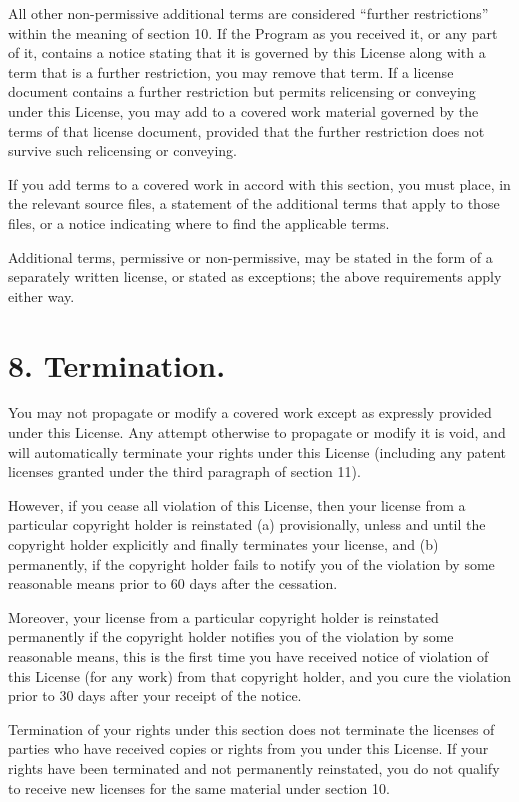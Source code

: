 \documentclass[11pt,a4paper]{article}
\begin{document}
All other non-permissive additional terms are considered “further
restrictions” within the meaning of section 10. If the Program as you
received it, or any part of it, contains a notice stating that it is
governed by this License along with a term that is a further
restriction, you may remove that term. If a license document contains a
further restriction but permits relicensing or conveying under this
License, you may add to a covered work material governed by the terms of
that license document, provided that the further restriction does not
survive such relicensing or conveying.

If you add terms to a covered work in accord with this section, you must
place, in the relevant source files, a statement of the additional terms
that apply to those files, or a notice indicating where to find the
applicable terms.

Additional terms, permissive or non-permissive, may be stated in the
form of a separately written license, or stated as exceptions; the above
requirements apply either way.

\part*{8. Termination.}

You may not propagate or modify a covered work except as expressly
provided under this License. Any attempt otherwise to propagate or
modify it is void, and will automatically terminate your rights under
this License (including any patent licenses granted under the third
paragraph of section 11).

However, if you cease all violation of this License, then your license
from a particular copyright holder is reinstated (a) provisionally,
unless and until the copyright holder explicitly and finally terminates
your license, and (b) permanently, if the copyright holder fails to
notify you of the violation by some reasonable means prior to 60 days
after the cessation.

Moreover, your license from a particular copyright holder is reinstated
permanently if the copyright holder notifies you of the violation by
some reasonable means, this is the first time you have received notice
of violation of this License (for any work) from that copyright holder,
and you cure the violation prior to 30 days after your receipt of the
notice.

Termination of your rights under this section does not terminate the
licenses of parties who have received copies or rights from you under
this License. If your rights have been terminated and not permanently
reinstated, you do not qualify to receive new licenses for the same
material under section 10.
\end{document}
